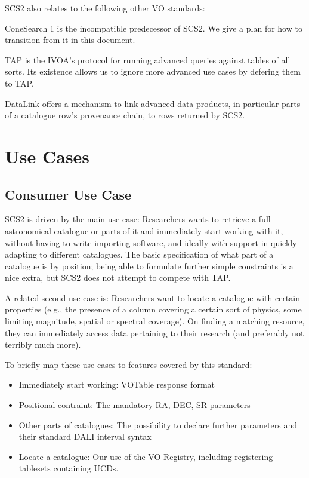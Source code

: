 \documentclass[11pt,a4paper]{ivoa}
\begin{document}
SCS2 also relates to the following other VO standards:

\begin{bigdescription}
 \item[ConeSearch 1] \citet{2008ivoa.specQ0222P} is the incompatible
predecessor of SCS2.  We give a plan for how to transition from it in
this document.

\item[TAP] \citet{2019ivoa.spec.0927D} is the IVOA's protocol for
running advanced queries against tables of all sorts.  Its existence
allows us to ignore more advanced use cases by defering them to TAP.

\item[DataLink] \citet{2023ivoa.spec.1215B} offers a mechanism to link
advanced data products, in particular parts of a catalogue row's
provenance chain, to rows returned by SCS2.
\end{bigdescription}

\section{Use Cases}

\subsection{Consumer Use Case}

SCS2 is driven by the main use case: Researchers wants to retrieve a
full astronomical catalogue or parts of it and immediately start working
with it, without having to write importing software, and ideally with
support in quickly adapting to different catalogues.  The basic
specification of what part of a catalogue is by position; being able to
formulate further simple constraints is a nice extra, but SCS2 does not
attempt to compete with TAP.

A related second use case is: Researchers want to locate a catalogue
with certain properties (e.g., the presence of a column covering a
certain sort of physics, some limiting magnitude, spatial or spectral
coverage).  On finding a matching resource, they can immediately access
data pertaining to their research (and preferably not terribly much
more).

To briefly map these use cases to features covered by this standard:

\begin{itemize}
\item Immediately start working: VOTable response format
\item Positional contraint: The mandatory RA, DEC, SR parameters
\item Other parts of catalogues: The possibility to declare further
parameters and their standard DALI interval syntax
\item Locate a catalogue: Our use of the VO Registry, including
registering tablesets containing UCDs.
\end{itemize}
\end{document}

